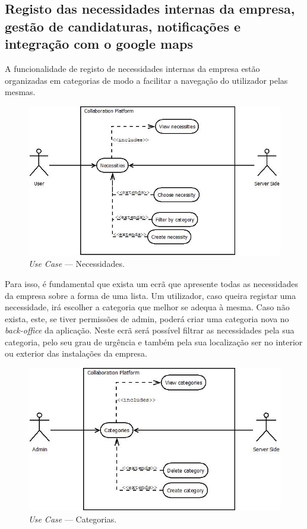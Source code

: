 \subsection{Registo das necessidades internas da empresa, gestão de candidaturas, notificações e integração com o google maps}\label{subsec:necessitiesCandidatesNotificationsGoogleMaps}

A funcionalidade de registo de necessidades internas da empresa estão organizadas em categorias de modo a facilitar a navegação do utilizador pelas mesmas.

\begin{figure}[H]
    \centering
    \includegraphics[scale=0.6]{figures/Necessities.jpeg}
    \caption{\textit{Use Case} --- Necessidades.}\label{fig:uc:necessities}
\end{figure}

Para isso, é fundamental que exista um ecrã que apresente todas as necessidades da empresa sobre a forma de uma lista. 
Um utilizador, caso queira registar uma necessidade, irá escolher a categoria que melhor se adequa à mesma. 
Caso não exista, este, se tiver permissões de admin, poderá criar uma categoria nova no \textit{back-office} da aplicação. 
Neste ecrã será possível filtrar as necessidades pela sua categoria, pelo seu grau de urgência e também pela sua localização ser no interior ou exterior das instalações da empresa.

\begin{figure}[H]
    \centering
    \includegraphics[scale=0.6]{figures/Categories use case.jpeg}
    \caption{\textit{Use Case} --- Categorias.}\label{fig:uc:categories}
\end{figure}

